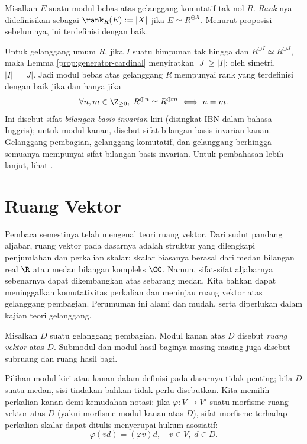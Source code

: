 \begin{definition}\label{def:rank-module}
	Misalkan $E$ suatu modul bebas atas gelanggang komutatif tak nol $R$. \emph{Rank}-nya didefinisikan sebagai $\rank_R(E) := |X|$ jika $E \simeq R^{\oplus X}$. Menurut proposisi sebelumnya, ini terdefinisi dengan baik.
\end{definition}

\begin{remark}\label{rem:IBN}
	Untuk gelanggang umum $R$, jika $I$ suatu himpunan tak hingga dan $R^{\oplus I} \simeq R^{\oplus J}$, maka Lemma \ref{prop:generator-cardinal} menyiratkan $|J| \geq |I|$; oleh simetri, $|I|=|J|$. Jadi modul bebas atas gelanggang $R$ mempunyai rank yang terdefinisi dengan baik jika dan hanya jika
	\[ \forall n,m \in \Z_{\geq 0}, \; R^{\oplus n} \simeq R^{\oplus m} \iff n=m. \]
	Ini disebut sifat \emph{bilangan basis invarian} kiri (disingkat IBN dalam bahasa Inggris); untuk modul kanan, disebut sifat bilangan basis invarian kanan. Gelanggang pembagian, gelanggang komutatif, dan gelanggang berhingga semuanya mempunyai sifat bilangan basis invarian. Untuk pembahasan lebih lanjut, lihat \cite[\S 1]{Lam99}.
\end{remark}

\section{Ruang Vektor}\label{sec:vector-space}
Pembaca semestinya telah mengenal teori ruang vektor. Dari sudut pandang aljabar, ruang vektor pada dasarnya adalah struktur yang dilengkapi penjumlahan dan perkalian skalar; skalar biasanya berasal dari medan bilangan real $\R$ atau medan bilangan kompleks $\CC$. Namun, sifat-sifat aljabarnya sebenarnya dapat dikembangkan atas sebarang medan. Kita bahkan dapat meninggalkan komutativitas perkalian dan meninjau ruang vektor atas gelanggang pembagian. Perumuman ini alami dan mudah, serta diperlukan dalam kajian teori gelanggang.

\begin{definition}
	Misalkan $D$ suatu gelanggang pembagian. Modul kanan atas $D$ disebut \emph{ruang vektor} atas $D$. Submodul dan modul hasil baginya masing-masing juga disebut subruang dan ruang hasil bagi.
\end{definition}
Pilihan modul kiri atau kanan dalam definisi pada dasarnya tidak penting; bila $D$ suatu medan, sisi tindakan bahkan tidak perlu disebutkan. Kita memilih perkalian kanan demi kemudahan notasi: jika $\varphi: V \to V'$ suatu morfisme ruang vektor atas $D$ (yakni morfisme modul kanan atas $D$), sifat morfisme terhadap perkalian skalar dapat ditulis menyerupai hukum asosiatif:
\[ \varphi (vd) = (\varphi v)d, \quad v \in V, \; d \in D. \]

